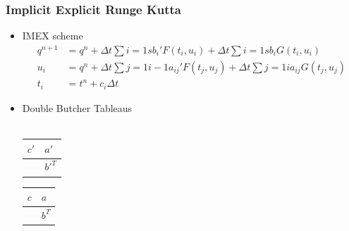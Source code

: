 \documentclass[10pt]{beamer}
\begin{document}
\begin{frame}
  \frametitle{Implicit Explicit Runge Kutta}
  \begin{itemize}
    \item IMEX scheme
      \begin{align*}
        q^{n+1} &= q^n + \Delta t \sum{i = 1}{s}{b_i' F(t_i, u_i)} + \Delta t \sum{i=1}{s}{b_i G(t_i, u_i)} \\
        u_i &= q^n + \Delta t \sum{j = 1}{i-1}{a_{ij}' F(t_j, u_j)} + \Delta t \sum{j=1}{i}{a_{ij} G(t_j, u_j)} \\
        t_i &= t^n + c_i \Delta t
      \end{align*}

    \item Double Butcher Tableaus \hfill \\ \hfill \\
      \begin{tabular}{r|l}
        \(c'\) & \(a'\) \\
        \midrule
          & \(b'^T\)
      \end{tabular}
      \begin{tabular}{r|l}
        \(c\) & \(a\) \\
        \midrule
          & \(b^T\)
      \end{tabular}
  \end{itemize}
\end{frame}
\end{document}
